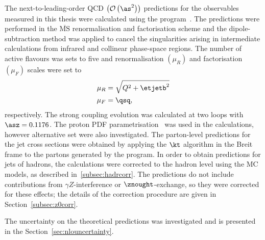 The next-to-leading-order QCD $ \left( \mathcal{O}\left( \as^2\right) \right) $ predictions for the observables measured in this thesis were calculated using the \nlojet program~\cite{Nagy:1998bb, Nagy:2001xb}. The predictions were performed in the $\overline{\text{MS}}$ renormalisation and factorisation scheme and the dipole-subtraction method was applied to cancel the singularities arising in intermediate calculations from infrared and collinear phase-space regions. The number of active flavours was sets to five and renormalisation $\left( \mu_R \right) $ and factorisation $\left( \mu_F \right) $ scales were set to 
\begin{align}
\mu_R &= \sqrt{Q^2+\etjetb^2}\\
\mu_F &= \qsq,
\end{align}
respectively. The strong coupling evolution was calculated at two loops with $\asz=0.1176$. The  proton PDF parametrisation~\cite{upub:herapdf1.5} was used in the calculations, however alternative set were also investigated. The parton-level predictions for the jet cross sections were obtained by applying the $\kt$ algorithm in the Breit frame to the partons generated by the program. In order to obtain predictions for jets of hadrons, the calculations were corrected to the hadron level using the MC models, as described in~\ref{subsec:hadrcorr}. The predictions do not include contributions from $\gamma Z$-interference or $\znought$-exchange, so they were corrected for these effects; the details of the correction procedure are given in Section~\ref{subsec:z0corr}. 

The uncertainty on the theoretical predictions was investigated and is presented in the Section~\ref{sec:nlouncertainty}.